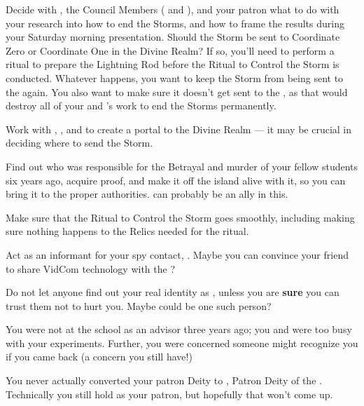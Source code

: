 \documentclass[char]{GL2020}
\begin{document}
\begin{itemz}
    \item Decide with \cHeadScientist{}, the Council Members (\cAntiChup{} and \cTechStar{}), and your patron \cDiplomat{} what to do with your research into how to end the Storms, and how to frame the results during your Saturday morning presentation. Should the Storm be sent to Coordinate Zero or Coordinate One in the Divine Realm? If so, you'll need to perform a ritual to prepare the Lightning Rod before the Ritual to Control the Storm is conducted. Whatever happens, you want to keep the Storm from being sent to the \pShip{} again. You also want to make sure it doesn’t get sent to the \pTech{}, as that would destroy all of your and \cHeadScientist{}’s work to end the Storms permanently.
    \item Work with \cCurse{}, \cFlowPriest{}, and \cAmbition{} to create a portal to the Divine Realm — it may be crucial in deciding where to send the Storm.
    \item Find out who was responsible for the Betrayal and murder of your fellow students six years ago, acquire proof, and make it off the island alive with it, so you can bring it to the proper authorities. \cHeir{} can probably be an ally in this.
\end{itemz}

\begin{itemz}
    \item Make sure that the Ritual to Control the Storm goes smoothly, including making sure nothing happens to the Relics needed for the ritual. 
    \item Act as an informant for your \pShippie{} spy contact, \cBunker{}. Maybe you can convince your friend \cTechStar{} to share \cTechStar{\their} VidCom technology with the \pShippies{}?
    \item Do not let anyone find out your real identity as \cKidScientist{\full}, unless you are \textbf{sure} you can trust them not to hurt you. Maybe \cMusic{} could be one such person? 
\end{itemz}

\begin{itemz}[Notes]
    \item You were not at the school as an advisor three years ago; you and \cHeadScientist{} were too busy with your experiments. Further, you were concerned someone might recognize you if you came back (a concern you still have!)
    \item You never actually converted your patron Deity to \cTechGod{\intro}, Patron Deity of the \pTech{}. Technically you still hold \cFarmGod{} as your patron, but hopefully that won't come up.
\end{itemz}
\end{document}
